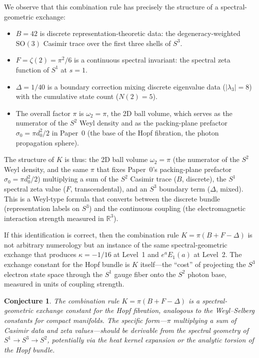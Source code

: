 \documentclass[aps,pra,twocolumn,superscriptaddress,longbibliography]{revtex4-2}
\newtheorem{conjecture}{Conjecture}
\begin{document}
We observe that this combination rule has precisely the structure
of a spectral-geometric exchange:
\begin{itemize}
  \item $B = 42$ is discrete representation-theoretic data:
    the degeneracy-weighted $\mathrm{SO}(3)$ Casimir trace over
    the first three shells of $S^3$.
  \item $F = \zeta(2) = \pi^2/6$ is a continuous spectral
    invariant: the spectral zeta function of $S^1$ at $s = 1$.
  \item $\Delta = 1/40$ is a boundary correction mixing discrete
    eigenvalue data ($|\lambda_3| = 8$) with the cumulative state
    count ($N(2) = 5$).
  \item The overall factor $\pi$ is $\omega_2 = \pi$, the 2D
    ball volume, which serves as the numerator of the $S^2$ Weyl
    density and as the packing-plane prefactor
    $\sigma_0 = \pi d_0^2 / 2$ in Paper~0 (the base of the Hopf
    fibration, the photon propagation sphere).
\end{itemize}

The structure of $K$ is thus: the 2D ball volume $\omega_2 = \pi$
(the numerator of the $S^2$ Weyl density, and the same $\pi$ that
fixes Paper~0's packing-plane prefactor $\sigma_0 = \pi d_0^2 / 2$)
multiplying a sum of the $S^2$ Casimir trace ($B$, discrete),
the $S^1$ spectral zeta value ($F$, transcendental), and an
$S^3$ boundary term ($\Delta$, mixed).  This is a Weyl-type
formula that converts between the discrete bundle
(representation labels on $S^3$) and the continuous coupling
(the electromagnetic interaction strength measured in
$\mathbb{R}^3$).

If this identification is correct, then the combination rule
$K = \pi(B + F - \Delta)$ is not arbitrary numerology but an
instance of the same spectral-geometric exchange that produces
$\kappa = -1/16$ at Level~1 and $e^a E_1(a)$ at Level~2.
The exchange constant for the Hopf bundle is $K$ itself---the
``cost'' of projecting the $S^3$ electron state space through
the $S^1$ gauge fiber onto the $S^2$ photon base, measured
in units of coupling strength.

\begin{conjecture}
The combination rule $K = \pi(B + F - \Delta)$ is a
spectral-geometric exchange constant for the Hopf fibration,
analogous to the Weyl--Selberg constants for compact manifolds.
The specific form---$\pi$ multiplying a sum of Casimir data
and zeta values---should be derivable from the spectral geometry
of $S^1 \to S^3 \to S^2$, potentially via the heat kernel
expansion or the analytic torsion of the Hopf bundle.
\end{conjecture}
\end{document}
